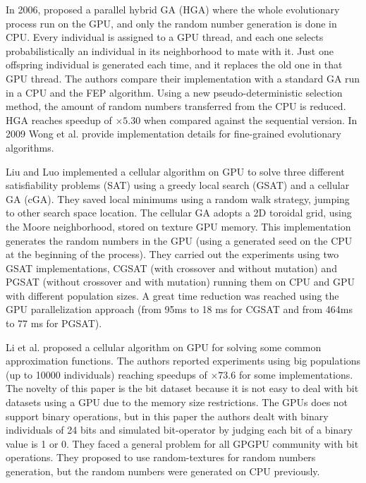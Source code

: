 \documentclass{article}
\begin{document}
In 2006, \cite{man-leung-wong-parallel-2006} proposed a parallel hybrid GA (HGA) where the whole evolutionary process run on the GPU, and only the random number generation is done in CPU. Every individual is assigned to a GPU thread, and each one selects probabilistically an individual in its neighborhood to mate with it. Just one offspring individual is generated each time, and it replaces the old one in that GPU thread. The authors compare their implementation with a standard GA run in a CPU and the FEP \cite{man-leung-wong-parallel-2005} algorithm. Using a new pseudo-deterministic selection method, the amount of random numbers transferred from the CPU is reduced. HGA reaches speedup of $\times5.30$ when compared against the sequential version. In 2009 Wong et al. \cite{wong-implementation-2009} provide implementation details for fine-grained evolutionary algorithms.  

Liu and Luo \cite{zhongwen-luo-cellular-2006} implemented a cellular algorithm on GPU to solve three different satisfiability problems (SAT) 
using a greedy local search (GSAT) \cite{Selman93domain-independentextensions} and a cellular GA (cGA). 
They saved local minimums using a random walk strategy, jumping to other search space location. 
The cellular GA adopts a 2D toroidal grid, using the Moore neighborhood, stored on texture GPU memory. This implementation generates the random numbers in the GPU (using a generated seed on the CPU at the beginning of the process). They carried out the experiments using two GSAT implementations, CGSAT (with crossover and without mutation) and PGSAT (without crossover and with mutation) running them on CPU and GPU with different population sizes. A great time reduction was reached using the GPU parallelization approach (from 95ms to 18 ms for CGSAT and from 464ms to 77 ms for PGSAT).

Li et al. \cite{jian_ming_li_efficient_2007} proposed a cellular algorithm on GPU for solving some common approximation functions. The authors reported experiments using big populations (up to 10000 individuals) reaching speedups of $\times73.6$ for some implementations. The novelty of this paper is the bit dataset because it is not easy to deal with bit datasets using a GPU due to the memory size restrictions. The GPUs does not support binary operations, but in this paper the authors dealt with binary individuals of 24 bits  and simulated bit-operator by judging each bit of a binary value is 1 or 0. They faced a general problem for all GPGPU community with bit operations. They proposed to use random-textures for random numbers generation, but the random numbers were generated on CPU previously. 
\end{document}
